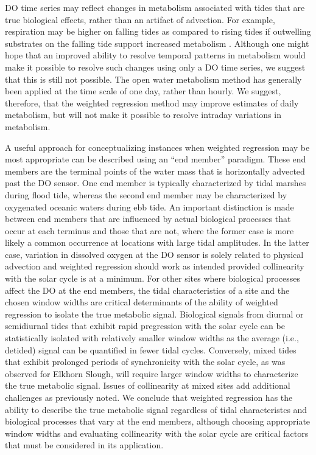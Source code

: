 \documentclass[letterpaper,12pt,oneside]{article}\usepackage[]{graphicx}\usepackage[]{color}
\begin{document}
\ac{DO} time series may reflect changes in metabolism associated with tides that are true biological effects, rather than an artifact of advection.  For example, respiration may be higher on falling tides as compared to rising tides if outwelling substrates on the falling tide support increased metabolism \citep{Sasaki09}.  Although one might hope that an improved ability to resolve temporal patterns in metabolism would make it possible to resolve such changes using only a \ac{DO} time series, we suggest that this is still not possible.  The open water metabolism method has generally been applied at the time scale of one day, rather than hourly.  We suggest, therefore, that the weighted regression method may improve estimates of daily metabolism, but will not make it possible to resolve intraday variations in metabolism.   

A useful approach for conceptualizing instances when weighted regression may be most appropriate can be described using an ``end member'' paradigm.  These end members are the terminal points of the water mass that is horizontally advected past the \ac{DO} sensor.  One end member is typically characterized by tidal marshes during flood tide, whereas the second end member may be characterized by oxygenated oceanic waters during ebb tide.  An important distinction is made between end members that are influenced by actual biological processes that occur at each terminus and those that are not, where the former case is more likely a common occurrence at locations with large tidal amplitudes.  In the latter case, variation in dissolved oxygen at the \ac{DO} sensor is solely related to physical advection and weighted regression should work as intended provided collinearity with the solar cycle is at a minimum.  For other sites where biological processes affect the \ac{DO} at the end members, the tidal characteristics of a site and the chosen window widths are critical determinants of the ability of weighted regression to isolate the true metabolic signal.  Biological signals from diurnal or semidiurnal tides that exhibit rapid pregression with the solar cycle can be statistically isolated with relatively smaller window widths as the average (i.e., detided) signal can be quantified in fewer tidal cycles.  Conversely, mixed tides that exhibit prolonged periods of synchronicity with the solar cycle, as was observed for Elkhorn Slough, will require larger window widths to characterize the true metabolic signal.  Issues of collinearity at mixed sites add additional challenges as previously noted.  We conclude that weighted regression has the ability to describe the true metabolic signal regardless of tidal characteristcs and biological processes that vary at the end members, although choosing appropriate window widths and evaluating collinearity with the solar cycle are critical factors that must be considered in its application.
\end{document}
